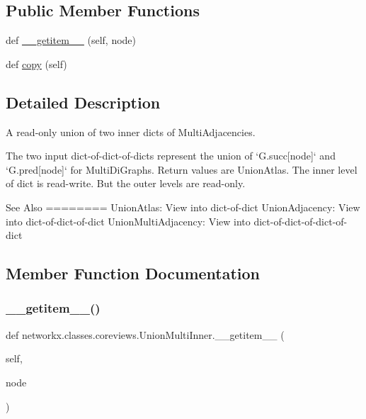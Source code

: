 \subsection*{Public Member Functions}
\begin{DoxyCompactItemize}
\item 
def \hyperlink{classnetworkx_1_1classes_1_1coreviews_1_1UnionMultiInner_a5bdf1c71d56a14bc6258cddbfc825e6d}{\+\_\+\+\_\+getitem\+\_\+\+\_\+} (self, node)
\item 
def \hyperlink{classnetworkx_1_1classes_1_1coreviews_1_1UnionMultiInner_a0c0c03853f465e819bda4b334bfde19b}{copy} (self)
\end{DoxyCompactItemize}


\subsection{Detailed Description}
\begin{DoxyVerb}A read-only union of two inner dicts of MultiAdjacencies.

The two input dict-of-dict-of-dicts represent the union of
`G.succ[node]` and `G.pred[node]` for MultiDiGraphs.
Return values are UnionAtlas.
The inner level of dict is read-write. But the outer levels are read-only.

See Also
========
UnionAtlas: View into dict-of-dict
UnionAdjacency:  View into dict-of-dict-of-dict
UnionMultiAdjacency:  View into dict-of-dict-of-dict-of-dict
\end{DoxyVerb}
 

\subsection{Member Function Documentation}
\mbox{\label{classnetworkx_1_1classes_1_1coreviews_1_1UnionMultiInner_a5bdf1c71d56a14bc6258cddbfc825e6d}} 
\subsubsection{\texorpdfstring{\+\_\+\+\_\+getitem\+\_\+\+\_\+()}{\_\_getitem\_\_()}}
{\footnotesize\ttfamily def networkx.\+classes.\+coreviews.\+Union\+Multi\+Inner.\+\_\+\+\_\+getitem\+\_\+\+\_\+ (\begin{DoxyParamCaption}\item[{}]{self,  }\item[{}]{node }\end{DoxyParamCaption})}

